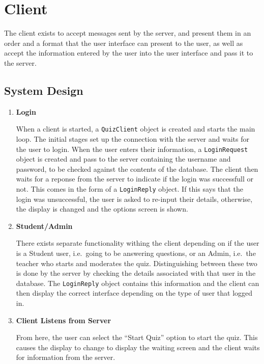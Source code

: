 \section{Client}
\label{sec:client}

The client exists to accept messages sent by the server, and present them in an
order and a format that the user interface can present to the user, as well as
accept the information entered by the user into the user interface and pass it
to the server.

\subsection{System Design}
\label{sub:client_system_design}

\begin{enumerate}

	\item \textbf{Login}

	When a client is started, a \texttt{QuizClient} object is created and
	starts the main loop. The initial stages set up the connection with the
	server and waits for the user to login. When the user enters their
	information, a \texttt{LoginRequest} object is created and pass to the
	server containing the username and password, to be checked against the
	contents of the database. The client then waits for a reponse from the
	server to indicate if the login was successfull or not. This comes in the
	form of a \texttt{LoginReply} object. If this says that the login was
	unsuccessful, the user is asked to re-input their details, otherwise, the
	display is changed and the options screen is shown.

	\item \textbf{Student/Admin}

	There exists separate functionality withing the client depending on if the
	user is a Student user, i.e.\ going to be answering questions, or an Admin,
	i.e.\ the teacher who starts and moderates the quiz. Distinguishing between
	these two is done by the server by checking the details associated with
	that user in the database. The \texttt{LoginReply} object contains this
	information and the client can then display the correct interface depending
	on the type of user that logged in.

	\item \textbf{Client Listens from Server}

	From here, the user can select the ``Start Quiz'' option to start the
	quiz. This causes the display to change to display the waiting screen and
	the client waits for information from the server.


\end{enumerate}
